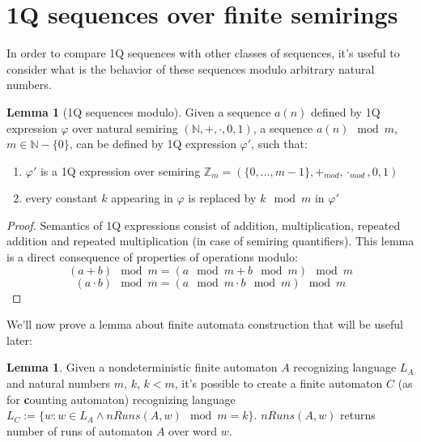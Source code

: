 \documentclass[12pt]{article}
\theoremstyle{definition}
\newtheorem{lemma}[theorem]{Lemma}
\begin{document}

\section{1Q sequences over finite semirings}
\label{Sec1QFiniteSemirings}
In order to compare 1Q sequences with other classes of sequences, it's useful to consider what is the behavior of these sequences modulo arbitrary natural numbers.

\begin{lemma}[1Q sequences modulo]
    \label{1QModulo}
    Given a sequence $a(n)$ defined by 1Q expression $\varphi$ over natural semiring $(\mathbb{N}, +, \cdot, 0, 1)$, a sequence $a(n) \mod m$, $m \in \mathbb{N} - \{0\}$, can be defined by 1Q expression $\varphi'$, such that:
    \begin{enumerate}
        \item $\varphi'$ is a 1Q expression over semiring $\mathbb{Z}_m = (\{0,\ldots,m-1\}, +_{mod}, \cdot_{mod}, 0, 1)$
        \item every constant $k$ appearing in $\varphi$ is replaced by $k \mod m$ in $\varphi'$
    \end{enumerate}
\end{lemma}

\begin{proof}
    Semantics of 1Q expressions consist of addition, multiplication, repeated addition and repeated multiplication (in case of semiring quantifiers). This lemma is a direct consequence of properties of operations modulo:
    $$(a + b) \mod m = (a \mod m + b \mod m) \mod m$$
    $$(a \cdot b) \mod m = (a \mod m \cdot b \mod m) \mod m$$
\end{proof}

We'll now prove a lemma about finite automata construction that will be useful later:

\begin{lemma}
    \label{CountRunsAutomaton}
    Given a nondeterministic finite automaton $A$ recognizing language $L_A$ and natural numbers $m$, $k$, $k < m$, it's possible to create a finite automaton $C$ (as for \textbf{c}ounting automaton) recognizing language $L_{C} := \{ w : w \in L_A \land nRuns(A, w) \mod m = k \}$. $nRuns(A, w)$ returns number of runs of automaton $A$ over word $w$.
\end{lemma}
\end{document}
